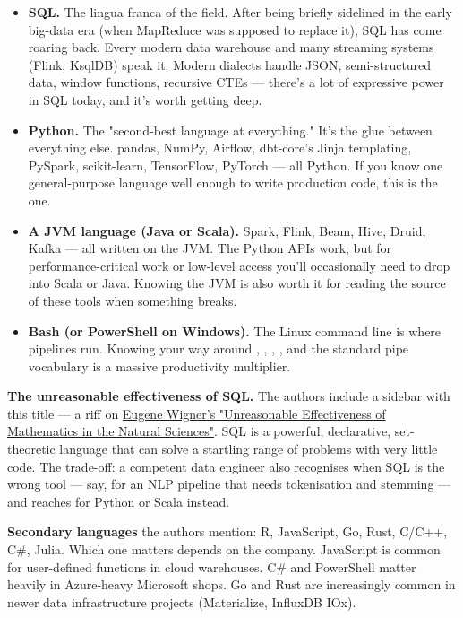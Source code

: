 \begin{itemize}[leftmargin=*]
  \item \textbf{SQL.} The lingua franca of the field. After being briefly sidelined in the early big-data era (when MapReduce was supposed to replace it), SQL has come roaring back. Every modern data warehouse and many streaming systems (Flink, KsqlDB) speak it. Modern dialects handle JSON, semi-structured data, window functions, recursive CTEs — there's a lot of expressive power in SQL today, and it's worth getting deep.
  \item \textbf{Python.} The "second-best language at everything." It's the glue between everything else. pandas, NumPy, Airflow, dbt-core's Jinja templating, PySpark, scikit-learn, TensorFlow, PyTorch — all Python. If you know one general-purpose language well enough to write production code, this is the one.
  \item \textbf{A JVM language (Java or Scala).} Spark, Flink, Beam, Hive, Druid, Kafka — all written on the JVM. The Python APIs work, but for performance-critical work or low-level access you'll occasionally need to drop into Scala or Java. Knowing the JVM is also worth it for reading the source of these tools when something breaks.
  \item \textbf{Bash (or PowerShell on Windows).} The Linux command line is where pipelines run. Knowing your way around , , , , and the standard pipe vocabulary is a massive productivity multiplier.
\end{itemize}

\begin{tipbox}
\textbf{The unreasonable effectiveness of SQL.} The authors include a sidebar with this title — a riff on \href{https://www.youtube.com/watch?v=PlGw1HBl5p8}{Eugene Wigner's "Unreasonable Effectiveness of Mathematics in the Natural Sciences"}. SQL is a powerful, declarative, set-theoretic language that can solve a startling range of problems with very little code. The trade-off: a competent data engineer also recognises when SQL is the wrong tool — say, for an NLP pipeline that needs tokenisation and stemming — and reaches for Python or Scala instead.
\end{tipbox}

\textbf{Secondary languages} the authors mention: R, JavaScript, Go, Rust, C/C++, C\#, Julia. Which one matters depends on the company. JavaScript is common for user-defined functions in cloud warehouses. C\# and PowerShell matter heavily in Azure-heavy Microsoft shops. Go and Rust are increasingly common in newer data infrastructure projects (Materialize, InfluxDB IOx).

